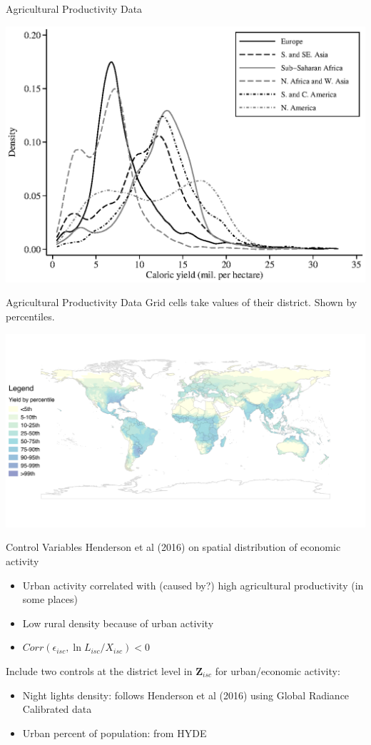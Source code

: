 \documentclass[10pt, xcolor=dvipsnames]{beamer}
\begin{document}
\begin{frame}{Agricultural Productivity Data}
\begin{center}
\includegraphics[width=.8\textwidth]{fig_dens_csi.eps}
\end{center}
\end{frame}

\begin{frame}{Agricultural Productivity Data}
Grid cells take values of their district. Shown by percentiles.
\vspace{-.5in}
\begin{center}
\includegraphics[scale=.5]{fig_csi_yield_map.png}
\end{center}
\end{frame}

\begin{frame}{Control Variables}
Henderson et al (2016) on spatial distribution of economic activity
\begin{itemize}
  \item Urban activity correlated with (caused by?) high agricultural productivity (in some places)
  \item Low rural density because of urban activity
  \item $Corr(\epsilon_{isc},\ln L_{isc}/X_{isc})<0$
\end{itemize}

Include two controls at the district level in $\mathbf{Z}_{isc}$ for urban/economic activity:
\begin{itemize}
  \item Night lights density: follows Henderson et al (2016) using Global Radiance Calibrated data
  \item Urban percent of population: from HYDE
\end{itemize}

\end{frame}
\end{document}
